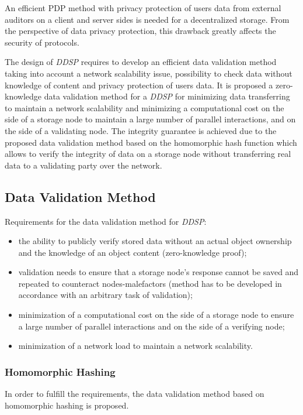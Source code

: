 \documentclass[a4paper, 11pt]{article}
\begin{document}
An efficient PDP method with privacy protection of users data from external auditors on a client and 
server sides is needed for a decentralized storage. From the perspective of data privacy protection, 
this drawback greatly affects the security of protocols. 

The design of \textit{DDSP} requires to develop an
efficient data validation method taking into account a network scalability issue, possibility to 
check data without knowledge of content and privacy protection of users data. 
It is proposed a zero-knowledge data validation method for a \textit{DDSP} for minimizing
data transferring to maintain a network scalability and minimizing a computational cost on the side
of a storage node to maintain a large number of parallel interactions, and on the side of a validating
node. The integrity guarantee is achieved due to the proposed data validation method based on the
homomorphic hash function which allows to verify the integrity of data on a storage node without
transferring real data to a validating party over the network. 

\subsection{Data Validation Method}

Requirements for the data validation method for \textit{DDSP}: 

\begin{itemize}
\item the ability to publicly verify stored data without an actual object ownership and the knowledge of an object content (zero-knowledge proof);
\item validation needs to ensure that a storage node’s response cannot be saved and repeated to counteract nodes-malefactors (method has to be developed in accordance with an arbitrary task of validation);
\item minimization of a computational cost on the side of a storage node to ensure a large number
of parallel interactions and on the side of a verifying node;
\item minimization of a network load to maintain a network scalability.
\end{itemize}

\subsubsection{Homomorphic Hashing}
In order to fulfill the requirements, the data validation method based on homomorphic hashing is proposed. 
\end{document}
